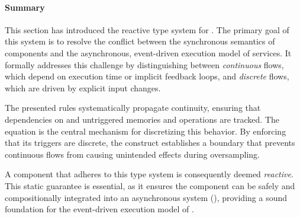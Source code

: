 \paragraph{Summary}

This section has introduced the reactive type system for \GRSync. The primary goal of this system is
to resolve the conflict between the synchronous semantics of components and the asynchronous,
event-driven execution model of services. It formally addresses this challenge by distinguishing
between \emph{continuous} flows, which depend on execution time or implicit feedback loops, and
\emph{discrete} flows, which are driven by explicit input changes.

The presented rules systematically propagate continuity, ensuring that dependencies on \timeop and
untriggered  memories and  operations are tracked. The  equation is
the central mechanism for discretizing this behavior. By enforcing that its triggers are discrete,
the  construct establishes a boundary that prevents continuous flows from causing
unintended effects during oversampling.

A component that adheres to this type system is consequently deemed \emph{reactive}. This static
guarantee is essential, as it ensures the component can be safely and compositionally integrated
into an asynchronous system (\cf {}), providing a
sound foundation for the event-driven execution model of \GRust.
